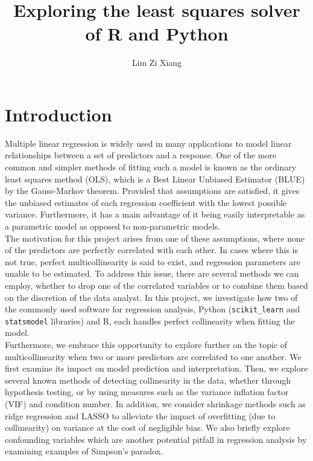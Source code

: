 \documentclass[12pt]{article}
\title{Exploring the least squares solver of R and Python}
\author{Lim Zi Xiang}
\date{}
\begin{document}
	\tableofcontents
	\pagebreak
	
	\section{Introduction}
	
	Multiple linear regression is widely used in many applications to model linear relationships between a set of predictors and a response. One of the more common and simpler methods of fitting such a model is known as the ordinary least squares method (OLS), which is a Best Linear Unbiased Estimator (BLUE) by the Gauss-Markov theorem. Provided that assumptions are satisfied, it gives the unbiased estimates of each regression coefficient with the lowest possible variance. Furthermore, it has a main advantage of it being easily interpretable as a parametric model as opposed to non-parametric models.\\
	
	\setlength\parindent{24pt} The motivation for this project arises from one of these assumptions, where none of the predictors are perfectly correlated with each other. In cases where this is not true, perfect multicollinearity is said to exist, and regression parameters are unable to be estimated. To address this issue, there are several methods we can employ, whether to drop one of the correlated variables or to combine them based on the discretion of the data analyst. In this project, we investigate how two of the commonly used software for regression analysis, Python (\texttt{scikit\_learn} and \texttt{statsmodel} libraries) and R, each handles perfect collinearity when fitting the model.\\
	
	Furthermore, we embrace this opportunity to explore further on the topic of multicollinearity when two or more predictors are correlated to one another.\cite{McClave2018} We first examine its impact on model prediction and interpretation. Then, we explore several known methods of detecting collinearity in the data, whether through hypothesis testing, or by using measures such as the variance inflation factor (VIF) and condition number. In addition, we consider shrinkage methods such as ridge regression and LASSO to alleviate the impact of overfitting (due to collinearity) on variance at the cost of negligible bias. We also briefly explore confounding variables which are another potential pitfall in regression analysis by examining examples of Simpson's paradox.\\
	
\end{document}
